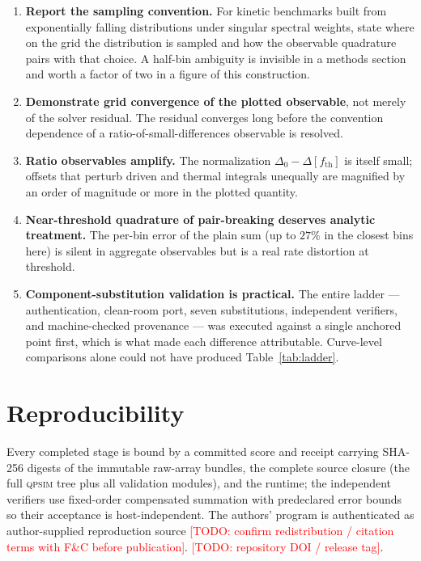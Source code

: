 \documentclass[reprint,amsmath,amssymb,aps,prapplied,nofootinbib]{revtex4-2}
\newcommand{\todo}[1]{\textcolor{red}{[TODO: #1]}}
\newcommand{\qpsim}{\textsc{qpsim}}
\begin{document}
\begin{enumerate}
\item \textbf{Report the sampling convention.}  For kinetic benchmarks
built from exponentially falling distributions under singular spectral
weights, state where on the grid the distribution is sampled and how the
observable quadrature pairs with that choice.  A half-bin ambiguity is
invisible in a methods section and worth a factor of two in a figure of
this construction.
\item \textbf{Demonstrate grid convergence of the plotted observable},
not merely of the solver residual.  The residual converges long before
the convention dependence of a ratio-of-small-differences observable is
resolved.
\item \textbf{Ratio observables amplify.}  The normalization
$\Delta_0 - \Delta[f_{\mathrm{th}}]$ is itself small; offsets that
perturb driven and thermal integrals unequally are magnified by an
order of magnitude or more in the plotted quantity.
\item \textbf{Near-threshold quadrature of pair-breaking deserves
analytic treatment.}  The per-bin error of the plain sum (up to $27\%$
in the closest bins here) is silent in aggregate observables but is a
real rate distortion at threshold.
\item \textbf{Component-substitution validation is practical.}  The
entire ladder --- authentication, clean-room port, seven substitutions,
independent verifiers, and machine-checked provenance --- was executed
against a single anchored point first, which is what made each
difference attributable.  Curve-level comparisons alone could not have
produced Table~\ref{tab:ladder}.
\end{enumerate}

\section*{Reproducibility}

Every completed stage is bound by a committed score and receipt carrying
SHA-256 digests of the immutable raw-array bundles, the complete source
closure (the full \qpsim{} tree plus all validation modules), and the
runtime; the independent verifiers use fixed-order compensated
summation with predeclared error bounds so their acceptance is
host-independent.  The authors' program is authenticated as
author-supplied reproduction source \todo{confirm redistribution /
citation terms with F\&C before publication}.  \todo{repository DOI /
release tag}.
\end{document}
